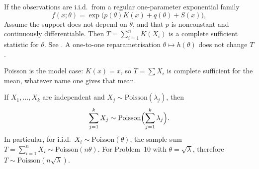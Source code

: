 \documentclass[11pt,a4paper]{article}
\begin{document}
\begin{theorem}
\label{thm:expfam-complete}
If the observations are i.i.d.\ from a regular one-parameter exponential family
\[
f(x;\theta)
=
\exp\bigl(p(\theta)K(x)+q(\theta)+S(x)\bigr),
\]
Assume the support does not depend on \(\theta\), and that \(p\) is nonconstant and continuously differentiable. Then \(T=\sum_{i=1}^n K(X_i)\) is a complete sufficient statistic for \(\theta\). See \citep[Theorems~7.5.1--7.5.2]{hogg2019}. A one-to-one reparametrisation \(\theta\mapsto h(\theta)\) does not change \(T\).
\end{theorem}

Poisson is the model case: \(K(x)=x\), so \(T=\sum X_i\) is complete sufficient for the mean, whatever name one gives that mean.

\begin{fact}
\label{fact:poisson-additive}
If \(X_1,\dots,X_k\) are independent and \(X_j\sim\mathrm{Poisson}(\lambda_j)\), then
\[
\sum_{j=1}^{k} X_j
\sim
\mathrm{Poisson}\Bigl(\sum_{j=1}^{k}\lambda_j\Bigr).
\]
In particular, for i.i.d.\ \(X_i\sim\mathrm{Poisson}(\theta)\), the sample sum \(T=\sum_{i=1}^{n}X_i\sim\mathrm{Poisson}(n\theta)\). For Problem~10 with \(\theta=\sqrt{\lambda}\), therefore \(T\sim\mathrm{Poisson}(n\sqrt{\lambda})\).
\end{fact}
\end{document}

